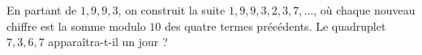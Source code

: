En partant de $1, 9, 9, 3$, on construit la suite $1, 9, 9, 3, 2, 3, 7, \ldots$, où chaque nouveau chiffre est la somme modulo $10$ des quatre termes précédents. Le quadruplet $7, 3, 6, 7$ apparaîtra-t-il un jour ?
